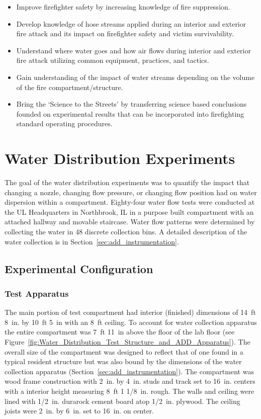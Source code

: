 \documentclass{book}
\begin{document}
\begin{itemize}
	\setlength{\itemindent}{0.25in}
	\item Improve firefighter safety by increasing knowledge of fire suppression.
	\item Develop knowledge of hose streams applied during an interior and exterior fire attack and its impact on firefighter safety and victim survivability.
	\item Understand where water goes and how air flows during interior and exterior fire attack utilizing common equipment, practices, and tactics.
	\item Gain understanding of the impact of water streams depending on the volume of the fire compartment/structure.
	\item Bring the `Science to the Streets' by transferring science based conclusions founded on experimental results that can be incorporated into firefighting standard operating procedures.
	\end{itemize}

\clearpage


\chapter{Water Distribution Experiments}

The goal of the water distribution experiments was to quantify the impact that changing a nozzle, changing flow pressure, or changing flow position had on water dispersion within a compartment. Eighty-four water flow tests were conducted at the UL Headquarters in Northbrook, IL in a purpose built compartment with an attached hallway and movable staircase. Water flow patterns were determined by collecting the water in 48 discrete collection bins. A detailed description of the water collection is in Section~\ref{sec:add_instrumentation}.

\section{Experimental Configuration}

\subsection{Test Apparatus}
\label{ADD_discussion}
The main portion of test compartment had interior (finished) dimensions of 14~ft 8~in. by 10~ft 5~in with an 8~ft ceiling. To account for water collection apparatus the entire compartment was 7~ft 11~in above the floor of the lab floor (see Figure~\ref{fig:Water_Distribution_Test_Structure_and_ADD_Apparatus}). The overall size of the compartment was designed to reflect that of one found in a typical resident structure but was also bound by the dimensions of the water collection apparatus (Section~\ref{sec:add_instrumentation}). The compartment was wood frame construction with 2~in. by 4~in. studs and track set to 16~in. centers with a interior height measuring 8~ft 1 1/8~in. rough. The walls and ceiling were lined with 1/2~in. durarock cement board atop 1/2~in. plywood. The ceiling joists were 2~in. by 6~in. set to 16~in. on center.
\end{document}
